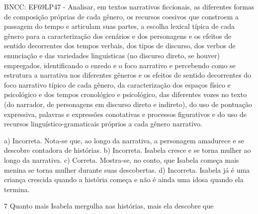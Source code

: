 \begin{escolha}
\begin{escolha}
\begin{escolha}
\begin{escolha}
\begin{escolha}
\begin{escolha}
\begin{escolha}
\begin{escolha}
\begin{escolha}
\begin{escolha}
\begin{escolha}
\begin{escolha}
\begin{escolha}
\begin{escolha}
BNCC: EF69LP47 - Analisar, em textos narrativos ficcionais, as
diferentes formas de composição próprias de cada gênero, os recursos
coesivos que constroem a passagem do tempo e articulam suas partes, a
escolha lexical típica de cada gênero para a caracterização dos cenários
e dos personagens e os efeitos de sentido decorrentes dos tempos
verbais, dos tipos de discurso, dos verbos de enunciação e das
variedades linguísticas (no discurso direto, se houver) empregados,
identificando o enredo e o foco narrativo e percebendo como se estrutura
a narrativa nos diferentes gêneros e os efeitos de sentido decorrentes
do foco narrativo típico de cada gênero, da caracterização dos espaços
físico e psicológico e dos tempos cronológico e psicológico, das
diferentes vozes no texto (do narrador, de personagens em discurso
direto e indireto), do uso de pontuação expressiva, palavras e
expressões conotativas e processos figurativos e do uso de recursos
linguístico-gramaticais próprios a cada gênero narrativo.

a) Incorreta. Nota-se que, ao longo da narrativa, a personagem amadurece
e se descobre contadora de histórias. b) Incorreta. Isabela cresce e se
torna mulher ao longo da narrativa. c) Correta. Mostra-se, no conto, que
Isabela começa mais menina se torna mulher durante suas descobertas. d)
Incorreta. Isabela já é uma criança crescida quando a história começa e
não é ainda uma idosa quando ela termina.

\num{7} Quanto mais Isabela mergulha nas histórias, mais ela descobre
que

\end{escolha}
\end{escolha}
\end{escolha}
\end{escolha}
\end{escolha}
\end{escolha}
\end{escolha}
\end{escolha}
\end{escolha}
\end{escolha}
\end{escolha}
\end{escolha}
\end{escolha}
\end{escolha}
